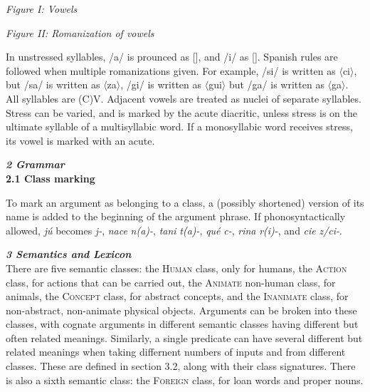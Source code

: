 \documentclass{article}[10pt]
\begin{document}
\begin{multicols}{2}
{\begin{center}
\emph{Figure I: Vowels}\\
 \Large
\begin{vowel}
\end{vowel} \end{center}}

{\begin{center}
\emph{Figure II: Romanization of vowels}\\
 \Large
\begin{vowel}
\end{vowel} \end{center}}
\end{multicols}

In unstressed syllables, /a/ is prounced as [], and /i/ as []. Spanish rules are followed when multiple romanizations given. For example, /si/ is written as $\langle$ci$\rangle$, but /sa/ is written as $\langle$za$\rangle$, /gi/ is written as $\langle$gui$\rangle$ but /ga/ is written as $\langle$ga$\rangle$. All syllables are (C)V. Adjacent vowels are treated as nuclei of separate syllables. Stress can be varied, and is marked by the acute diacritic, unless stress is on the ultimate syllable of a multisyllabic word. If a monosyllabic word receives stress, its vowel is marked with an acute.

\clearpage
{\bf \emph{2 Grammar}}\\

{\bf 2.1 Class marking}

    To mark an argument as belonging to a class, a (possibly shortened) version of its name is added to the beginning of the argument phrase. If phonosyntactically allowed, \emph{j\'{u}} becomes \emph{j-}, \emph{nace} \emph{n(a)-}, \emph{tani} \emph{t(a)-}, \emph{qu\'{e}} \emph{c-}, \emph{rina} \emph{r(i)-}, and \emph{cie} \emph{z/ci-}.  

\clearpage
{\bf \emph{3 Semantics and Lexicon}}\\

There are five semantic classes: the \textsc{Human} class, only for humans, the \textsc{Action} class, for actions that can be carried out, the \textsc{Animate} non-human class, for animals, the \textsc{Concept} class, for abstract concepts, and the \textsc{Inanimate} class, for non-abstract, non-animate physical objects. Arguments can be broken into these classes, with cognate arguments in different semantic classes having different but often related meanings. Similarly, a single predicate can have several different but related meanings when taking differnent numbers of inputs and from different classes. These are defined in section 3.2, along with their class signatures. There is also a sixth semantic class: the \textsc{Foreign} class, for loan words and proper nouns.\\
\end{document}
